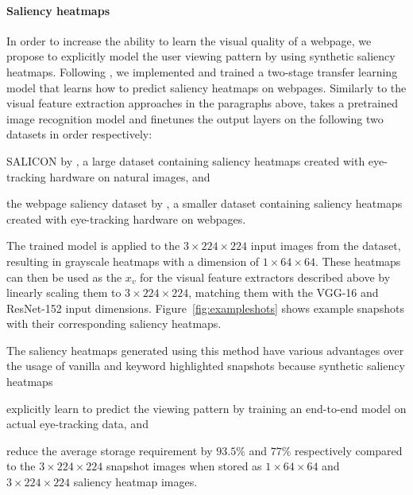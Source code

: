\paragraph{Saliency heatmaps}
In order to increase the ability to learn the visual quality of a webpage, we propose to explicitly model the user viewing pattern by using synthetic saliency heatmaps. 
Following \cite{shan2017two}, we implemented and trained a two-stage transfer learning model that learns how to predict saliency heatmaps on webpages.
Similarly to the visual feature extraction approaches in the paragraphs above, \cite{shan2017two} takes a pretrained image recognition model and finetunes the output layers on the following two datasets in order respectively:
\begin{inparaenum}[(i)]
\item SALICON by \cite{jiang2015salicon}, a large dataset containing saliency heatmaps created with eye-tracking hardware on natural images, and 
\item the webpage saliency dataset by \cite{shen2014webpage}, a smaller dataset containing saliency heatmaps created with eye-tracking hardware on webpages.
\end{inparaenum}

The trained model is applied to the $3\times224\times224$ input images from the \datasetname data\-set, resulting in grayscale heatmaps with a dimension of $1\times64\times64$. These heatmaps can then be used as the $x_{v}$ for the visual feature extractors described above by linearly scaling them to $3\times224\times224$, matching them with the VGG-16 and ResNet-152 input dimensions. Figure~\ref{fig:exampleshots} shows example snapshots with their corresponding saliency heatmaps.

The saliency heatmaps generated using this method have various advantages over the usage of vanilla and keyword highlighted snapshots because synthetic saliency heatmaps
\begin{inparaenum}[(i)]
\item explicitly learn to predict the viewing pattern by training an end-to-end model on actual eye-tracking data, and 
\item reduce the average storage requirement by $93.5\%$ and $77\%$ respectively compared to the $3\times224\times224$ snapshot images when stored as $1\times64\times64$ and $3\times224\times224$ saliency heatmap images.
\end{inparaenum}
